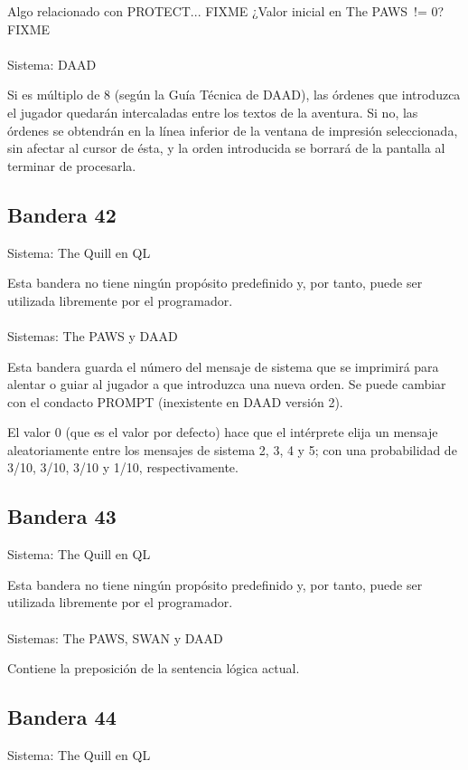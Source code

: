 \documentclass[11pt, a5paper]{article}
\newcommand{\quill}{\textsf{The Quill}\xspace}
\newcommand{\paw}{\textsf{The PAWS}\xspace}
\newcommand{\swan}{\textsf{SWAN}\xspace}
\newcommand{\daad}{\textsf{DAAD}\xspace}
\newcommand{\sistema}[1]{\noindent Sistema: #1 \nopagebreak}
\newcommand{\sistemas}[1]{\noindent Sistemas: #1 \nopagebreak}
\begin{document}
Algo relacionado con PROTECT... FIXME
¿Valor inicial en \paw\ != 0? FIXME
\\\ \\
\sistema{\daad}

Si es múltiplo de 8 (según la Guía Técnica de \daad \cite[pág. 61]{DAAD}), las órdenes que introduzca el jugador quedarán intercaladas entre los textos de la aventura. Si no, las órdenes se obtendrán en la línea inferior de la ventana de impresión seleccionada, sin afectar al cursor de ésta, y la orden introducida se borrará de la pantalla al terminar de procesarla.

\subsection{Bandera 42}

\sistema{\quill en QL}

Esta bandera no tiene ningún propósito predefinido y, por tanto, puede ser utilizada libremente por el programador.
\\\ \\
\sistemas{\paw y \daad}

Esta bandera guarda el número del mensaje de sistema que se imprimirá para alentar o guiar al jugador a que introduzca una nueva orden. Se puede cambiar con el condacto PROMPT (inexistente en \daad versión 2).

El valor 0 (que es el valor por defecto) hace que el intérprete elija un mensaje aleatoriamente entre los mensajes de sistema 2, 3, 4 y 5; con una probabilidad de 3/10, 3/10, 3/10 y 1/10, respectivamente.

\subsection{Bandera 43}

\sistema{\quill en QL}

Esta bandera no tiene ningún propósito predefinido y, por tanto, puede ser utilizada libremente por el programador.
\\\ \\
\sistemas{\paw, \swan y \daad}

Contiene la preposición de la sentencia lógica actual.

\subsection{Bandera 44}

\sistema{\quill en QL}
\end{document}
